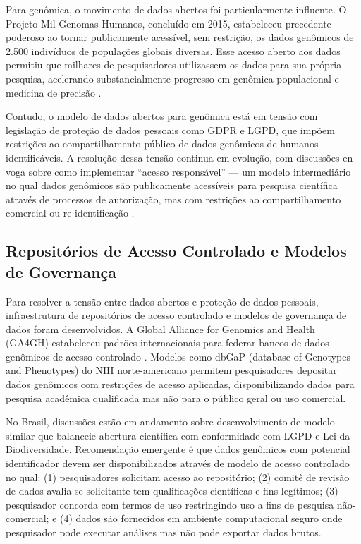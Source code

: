Para genômica, o movimento de dados abertos foi particularmente influente. O Projeto Mil Genomas Humanos, concluído em 2015, estabeleceu precedente poderoso ao tornar publicamente acessível, sem restrição, os dados genômicos de 2.500 indivíduos de populações globais diversas. Esse acesso aberto aos dados permitiu que milhares de pesquisadores utilizassem os dados para sua própria pesquisa, acelerando substancialmente progresso em genômica populacional e medicina de precisão \parencite{1000genomes2015}.

Contudo, o modelo de dados abertos para genômica está em tensão com legislação de proteção de dados pessoais como GDPR e LGPD, que impõem restrições ao compartilhamento público de dados genômicos de humanos identificáveis. A resolução dessa tensão continua em evolução, com discussões en voga sobre como implementar ``acesso responsável'' --- um modelo intermediário no qual dados genômicos são publicamente acessíveis para pesquisa científica através de processos de autorização, mas com restrições ao compartilhamento comercial ou re-identificação \parencite{ga4gh2018}.

\subsection{Repositórios de Acesso Controlado e Modelos de Governança}

Para resolver a tensão entre dados abertos e proteção de dados pessoais, infraestrutura de repositórios de acesso controlado e modelos de governança de dados foram desenvolvidos. A Global Alliance for Genomics and Health (GA4GH) estabeleceu padrões internacionais para federar bancos de dados genômicos de acesso controlado \parencite{ga4gh2018}. Modelos como dbGaP (database of Genotypes and Phenotypes) do NIH norte-americano permitem pesquisadores depositar dados genômicos com restrições de acesso aplicadas, disponibilizando dados para pesquisa acadêmica qualificada mas não para o público geral ou uso comercial.

No Brasil, discussões estão em andamento sobre desenvolvimento de modelo similar que balanceie abertura científica com conformidade com LGPD e Lei da Biodiversidade. Recomendação emergente é que dados genômicos com potencial identificador devem ser disponibilizados através de modelo de acesso controlado no qual: (1) pesquisadores solicitam acesso ao repositório; (2) comitê de revisão de dados avalia se solicitante tem qualificações científicas e fins legítimos; (3) pesquisador concorda com termos de uso restringindo uso a fins de pesquisa não-comercial; e (4) dados são fornecidos em ambiente computacional seguro onde pesquisador pode executar análises mas não pode exportar dados brutos.

